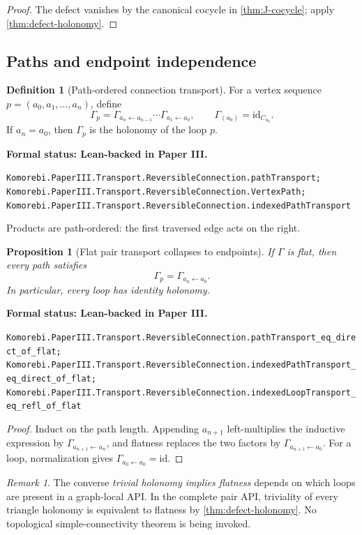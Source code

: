 \documentclass[11pt]{article}
\newtheorem{proposition}[theorem]{Proposition}
\theoremstyle{definition}
\newtheorem{definition}[theorem]{Definition}
\theoremstyle{remark}
\newtheorem{remark}[theorem]{Remark}
\newcommand{\id}{\mathrm{id}}
\newcommand{\leanname}[1]{\nolinkurl{#1}}
\newcommand{\statusleanthree}[1]{%
  \par\smallskip\noindent
  {\color{leanblue}\textbf{Formal status: Lean-backed in Paper III.}}\par
  \begingroup\small\raggedright\leanname{#1}\par\endgroup\smallskip}
\begin{document}
\begin{proof}
The defect vanishes by the canonical cocycle in
\cref{thm:J-cocycle}; apply \cref{thm:defect-holonomy}.
\end{proof}

\subsection{Paths and endpoint independence}

\begin{definition}[Path-ordered connection transport]
\label{def:path-transport}
For a vertex sequence
$p=(a_0,a_1,\ldots,a_n)$, define
\[
\Gamma_p
=
\Gamma_{a_n\leftarrow a_{n-1}}\cdots
\Gamma_{a_1\leftarrow a_0},
\qquad
\Gamma_{(a_0)}=\id_{C_{a_0}}.
\]
If $a_n=a_0$, then $\Gamma_p$ is the holonomy of the loop $p$.
\end{definition}
\statusleanthree{Komorebi.PaperIII.Transport.ReversibleConnection.pathTransport; Komorebi.PaperIII.Transport.ReversibleConnection.VertexPath; Komorebi.PaperIII.Transport.ReversibleConnection.indexedPathTransport}

Products are path-ordered: the first traversed edge acts on the right.

\begin{proposition}[Flat pair transport collapses to endpoints]
\label{prop:flat-endpoints}
If $\Gamma$ is flat, then every path satisfies
\[
\Gamma_p=\Gamma_{a_n\leftarrow a_0}.
\]
In particular, every loop has identity holonomy.
\end{proposition}
\statusleanthree{Komorebi.PaperIII.Transport.ReversibleConnection.pathTransport_eq_direct_of_flat; Komorebi.PaperIII.Transport.ReversibleConnection.indexedPathTransport_eq_direct_of_flat; Komorebi.PaperIII.Transport.ReversibleConnection.indexedLoopTransport_eq_refl_of_flat}

\begin{proof}
Induct on the path length.  Appending $a_{n+1}$ left-multiplies the
inductive expression by $\Gamma_{a_{n+1}\leftarrow a_n}$, and flatness
replaces the two factors by
$\Gamma_{a_{n+1}\leftarrow a_0}$.  For a loop, normalization gives
$\Gamma_{a_0\leftarrow a_0}=\id$.
\end{proof}

\begin{remark}
The converse \emph{trivial holonomy implies flatness} depends on which loops
are present in a graph-local API.  In the complete pair API, triviality of
every triangle holonomy is equivalent to flatness by
\cref{thm:defect-holonomy}.  No topological simple-connectivity theorem is
being invoked.
\end{remark}
\end{document}
